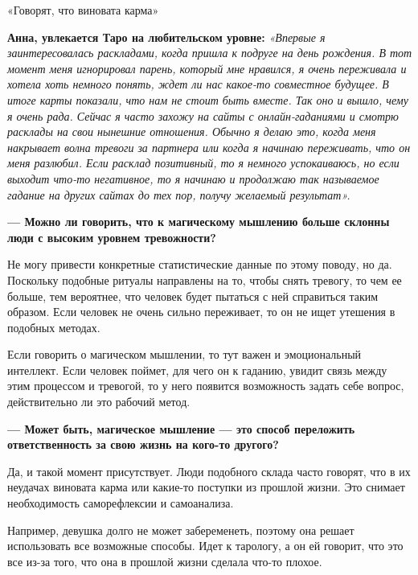 \vspace*{1em}
\begin{center}
    \Large «Говорят, что виновата карма»
\end{center}
\vspace*{1em}

\textbf{Анна, увлекается Таро на любительском уровне:} \textit{«Впервые я заинтересовалась раскладами, когда пришла к подруге на день рождения. В тот момент меня игнорировал парень, который мне нравился, я очень переживала и хотела хоть немного понять, ждет ли нас какое-то совместное будущее. В итоге карты показали, что нам не стоит быть вместе. Так оно и вышло, чему я очень рада. Сейчас я часто захожу на сайты с онлайн-гаданиями и смотрю расклады на свои нынешние отношения. Обычно я делаю это, когда меня накрывает волна тревоги за партнера или когда я начинаю переживать, что он меня разлюбил. Если расклад позитивный, то я немного успокаиваюсь, но если выходит что-то негативное, то я начинаю  и продолжаю так называемое гадание на других сайтах до тех пор,  получу желаемый результат». }

\textbf{--- Можно ли говорить, что к магическому мышлению больше склонны люди с высоким уровнем тревожности?}

Не могу привести конкретные статистические данные по этому поводу, но  да. Поскольку подобные ритуалы направлены на то, чтобы снять тревогу, то чем ее больше, тем вероятнее, что человек будет пытаться с ней справиться таким образом. Если человек не очень сильно переживает, то он не ищет утешения в подобных методах.

Если говорить о магическом мышлении, то тут важен и эмоциональный интеллект. Если человек поймет, для чего он  к гаданию, увидит связь между этим процессом и тревогой, то у него появится возможность задать себе вопрос, действительно ли это рабочий метод.

\textbf{--- Может быть, магическое мышление — это способ переложить ответственность за свою жизнь на кого-то другого?}

Да, и такой момент присутствует. Люди подобного склада часто говорят, что в их неудачах виновата карма или какие-то поступки из прошлой жизни. Это снимает необходимость саморефлексии и самоанализа.

Например, девушка долго не может забеременеть, поэтому она решает использовать все возможные способы. Идет к тарологу, а он ей говорит, что это все из-за того, что она в прошлой жизни сделала что-то плохое.

